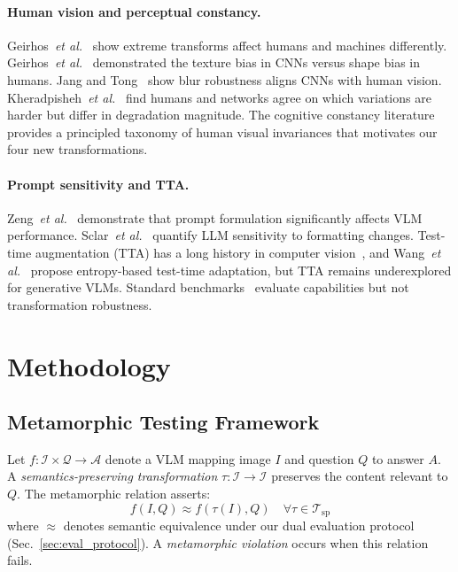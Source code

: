 \documentclass{cvpr}
\providecommand{\etal}{\textit{et al.}}
\begin{document}
\paragraph{Human vision and perceptual constancy.}
Geirhos~\etal~\cite{geirhos2023extreme} show extreme transforms affect humans and machines differently. Geirhos~\etal~\cite{geirhos2019imagenet} demonstrated the texture bias in CNNs versus shape bias in humans. Jang and Tong~\cite{jang2024improved} show blur robustness aligns CNNs with human vision. Kheradpisheh~\etal~\cite{kheradpisheh2016humans} find humans and networks agree on which variations are harder but differ in degradation magnitude. The cognitive constancy literature~\cite{walsh2014perceptual, palmer1999vision, kanizsa1979organization} provides a principled taxonomy of human visual invariances that motivates our four new transformations.

\paragraph{Prompt sensitivity and TTA.}
Zeng~\etal~\cite{zeng2024matters} demonstrate that prompt formulation significantly affects VLM performance. Sclar~\etal~\cite{sclar2024quantifying} quantify LLM sensitivity to formatting changes. Test-time augmentation (TTA) has a long history in computer vision~\cite{krizhevsky2012imagenet, shanmugam2021better}, and Wang~\etal~\cite{wang2021tent} propose entropy-based test-time adaptation, but TTA remains underexplored for generative VLMs. Standard benchmarks~\cite{liu2024mmbench, fu2023mme, li2023seed, huang2024trustllm} evaluate capabilities but not transformation robustness.

\section{Methodology}
\label{sec:methodology}

\subsection{Metamorphic Testing Framework}
\label{sec:metamorphic_framework}

Let $f: \mathcal{I} \times \mathcal{Q} \rightarrow \mathcal{A}$ denote a VLM mapping image $I$ and question $Q$ to answer $A$. A \textit{semantics-preserving transformation} $\tau: \mathcal{I} \rightarrow \mathcal{I}$ preserves the content relevant to $Q$. The metamorphic relation asserts:
\begin{equation}
    f(I, Q) \approx f(\tau(I), Q) \quad \forall \tau \in \mathcal{T}_{\text{sp}}
    \label{eq:metamorphic_relation}
\end{equation}
where $\approx$ denotes semantic equivalence under our dual evaluation protocol (Sec.~\ref{sec:eval_protocol}). A \textit{metamorphic violation} occurs when this relation fails.
\end{document}
